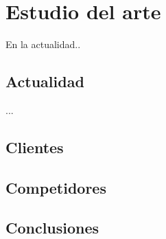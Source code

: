 \chapter{Estudio del arte}

\bigskip
En la actualidad..

\newpage
\section{Actualidad}

\bigskip
...

\newpage
\section{Clientes}

\newpage
\section{Competidores}

\newpage
\section{Conclusiones}








